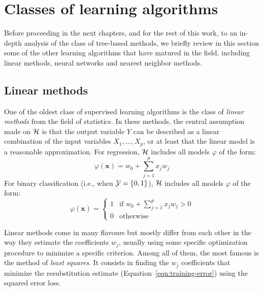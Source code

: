 \section{Classes of learning algorithms}
\label{sec:2:classes-of-algorithms}

Before proceeding in the next chapters, and for the rest of
this work, to an in-depth analysis of the class of tree-based methods,  we
briefly review in this section some of the other learning algorithms that have
matured in the field, including linear methods, neural networks and nearest
neighbor methods.

\subsection{Linear methods}

One of the oldest class of supervised learning algorithms is the class of
\textit{linear methods} from the field of statistics. In these methods, the central
assumption made on ${\cal H}$ is that the output variable $Y$ can be described
as a linear combination of the input variables $X_1, ..., X_p$, or at least
that the linear model is a reasonable approximation. For regression, ${\cal H}$
includes all models $\varphi$ of the form:
\begin{equation}
\varphi(\mathbf{x}) = w_0 + \sum_{j=1}^p x_j w_j
\end{equation}
For binary classification (i.e., when ${\cal Y}=\{0, 1\}$),  ${\cal H}$ includes all
models $\varphi$ of the form:
\begin{equation}
\varphi(\mathbf{x}) = \begin{cases}
1 & \text{if } w_0 + \sum_{j=1}^p x_j w_j > 0\\
0 & \text{otherwise}
\end{cases}
\end{equation}

Linear methods come in many flavours but mostly differ from each other in the
way they estimate the coefficients $w_j$, usually using some specific
optimization procedure to minimize a specific criterion. Among all of them, the
most famous is the method of \textit{least squares}. It consists in finding the
$w_j$ coefficients that minimize the resubstitution estimate
(Equation~\ref{eqn:training-error}) using the squared error loss.

